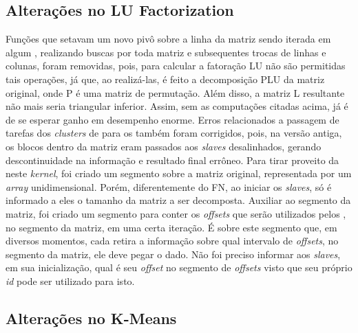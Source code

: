 \documentclass[a4paper,11pt]{article}
\begin{document}
\subsection{Alterações no LU Factorization}

Funções que setavam um novo pivô sobre a linha da matriz sendo iterada em algum \cc , realizando buscas por toda matriz e subsequentes trocas de linhas e colunas, foram removidas, pois, para calcular a fatoração LU não são permitidas tais operações, já que, ao realizá-las, é feito a decomposição PLU da matriz original, onde P é uma matriz de permutação. Além disso, a matriz L resultante não mais seria triangular inferior. Assim, sem as computações citadas acima, já é de se esperar ganho em desempenho enorme. Erros relacionados a passagem de tarefas dos \textit{clusters} de \io para os \ccs também foram corrigidos, pois, na versão antiga, os blocos dentro da matriz eram passados aos \textit{slaves} desalinhados, gerando descontinuidade na informação e resultado final errôneo. Para tirar proveito da \async neste \textit{kernel}, foi criado um segmento sobre a matriz original, representada por um \textit{array} unidimensional. Porém, diferentemente do FN, ao iniciar os \textit{slaves}, só é informado a eles o tamanho da matriz a ser decomposta. Auxiliar ao segmento da matriz, foi criado um segmento para conter os \textit{offsets} que serão utilizados pelos \ccs, no segmento da matriz, em uma certa iteração. É sobre este segmento que, em diversos momentos, cada \cc retira a informação sobre qual intervalo de \textit{offsets}, no segmento da matriz, ele deve pegar o dado. Não foi preciso informar aos \textit{slaves}, em sua inicialização, qual é seu \textit{offset} no segmento de \textit{offsets} visto que seu próprio \textit{id} pode ser utilizado para isto.

\subsection{Alterações no K-Means}
\end{document}
